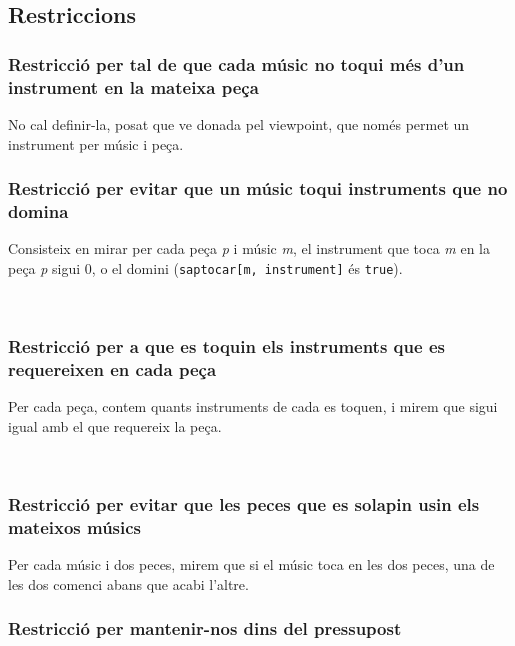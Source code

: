\documentclass[11pt,a4paper,twoside]{report}
\begin{document}


\subsection{Restriccions}


\subsubsection*{Restricció per tal de que cada músic no toqui més d'un instrument en la mateixa peça}

No cal definir-la, posat que ve donada pel viewpoint, que només permet un instrument per músic i peça.

\subsubsection*{Restricció per evitar que un músic toqui instruments que no domina}

Consisteix en mirar per cada peça \textit{p} i músic \textit{m}, el instrument que toca \textit{m} en la peça \textit{p} sigui 0, o el domini (\texttt{saptocar[m, instrument]} és \texttt{true}).

~\\


\subsubsection*{Restricció per a que es toquin els instruments que es requereixen en cada peça}

Per cada peça, contem quants instruments de cada es toquen, i mirem que sigui igual amb el que requereix la peça.

~\\



\subsubsection*{Restricció per evitar que les peces que es solapin usin els mateixos músics}
Per cada músic i dos peces, mirem que si el músic toca en les dos peces, una de les dos comenci abans que acabi l'altre.
~\\



\subsubsection*{Restricció per mantenir-nos dins del pressupost}
\end{document}
